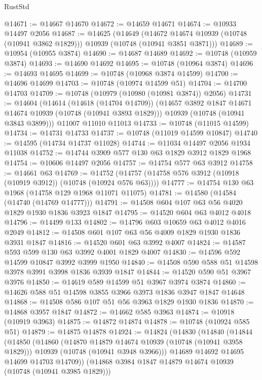 \begin{lexlean}{RustStd}
\begin{coremodule}
{\begin{coremodule}
{{{{{@14671 := @14667 @14670
@14672 := @14659 @14671
@14674 := @10933 @14497 @2056
@14687 := @14625
    (@14649
      (@14672 @14674 @10939 (@10748 (@10941 @3862 @1829)))
      @10939
      (@10748 (@10941 @3851 @3871)))
@14689 := @10954 (@10955 @3874)
@14690 := @14687 @14689
@14692 := @10748 (@10959 @3874)
@14693 := @14690 @14692
@14695 := @10748 (@10964 @3874)
@14696 := @14693 @14695
@14699 := @10748 (@10968 @3874 @14599)
@14700 := @14696 @14699
@14703 := @10748 (@10974 @14599 @51)
@14704 := @14700 @14703
@14709 := @10748 (@10979 (@10980 (@10981 @3874)) @2056)
@14731 := @14604
    (@14614
      (@14618 (@14704 @14709))
      (@14657 @3892 @1847 @14671 @14674 @10939 (@10748 (@10941 @3893 @1829)))
      @10939
      (@10748 (@10941 @3843 @3899)))
    @11007
    @11010
    @11013
@14733 := @10748 (@11015 @14599)
@14734 := @14731 @14733
@14737 := @10748 (@11019 @14599 @10847)
@14740 := @14595 (@14734 @14737 @11028)
@14744 := @11034 @14497 @2056 @1934 @11038
@14752 := @14744 @3909 @577 @130 @63 @1829 @3912 @1829 @1968
@14754 := @10606 @14497 @2056
@14757 := @14754 @577 @63 @3912
@14758 := @14661 @63
@14769 := @14752 (@14757 (@14758 @576 @3912 (@10918 (@10919 @3912)) (@10748 (@10924 @576 @63))))
@14777 := @14754 @130 @63 @1968 (@14758 @129 @1968 @11071 @11075)
@14781 := @14580 (@14584 (@14740 (@14769 @14777)))
@14791 := @14508 @604 @107 @63 @56 @4020 @1829 @1930 @1836 @3923 @1847
@14795 := @14520 @604 @63 @4012 @4018
@14796 := @14499 @133
@14802 := @14796 @603 @10659 @63 @4012 @4016 @2049
@14812 := @14508 @601 @107 @63 @56 @4009 @1829 @1930 @1836 @3931 @1847
@14816 := @14520 @601 @63 @3992 @4007
@14824 := @14587 @593 @599 @130 @63 @3992 @4001 @1829 @4007
@14830 := @14596 @592 @14599 @10847 @3992 @3999 @1950
@14840 := @14508 @590 @588 @51 @14598 @3978 @3991 @3998 @1836 @3939 @1847
@14844 := @14520 @590 @51 @3967 @3976
@14850 := @14619 @589 @14599 @51 @3967 @3974 @3874
@14860 := @14626 @588 @51 @14598 @3855 @3966 @3973 @1836 @3947 @1847 @14648
@14868 := @14508 @586 @107 @51 @56 @3963 @1829 @1930 @1836
@14870 := @14868 @3957 @1847
@14872 := @14662 @585 @3963
@14874 := @10918 (@10919 @3963)
@14875 := @14872 @14874
@14878 := @10748 (@10924 @585 @51)
@14879 := @14875 @14878
@14924 := @14824
    (@14830
      (@14840
        (@14844
          (@14850
            (@14860
              (@14870 @14879 @14674 @10939 (@10748 (@10941 @3958 @1829)))
              @10939
              (@10748 (@10941 @3948 @3966)))
            @14689
            @14692
            @14695
            @14699
            @14703
            @14709))
        (@14868 @3984 @1847 @14879 @14674 @10939 (@10748 (@10941 @3985 @1829)))
}}}}}
\end{coremodule}}
\end{coremodule}
\end{lexlean}
